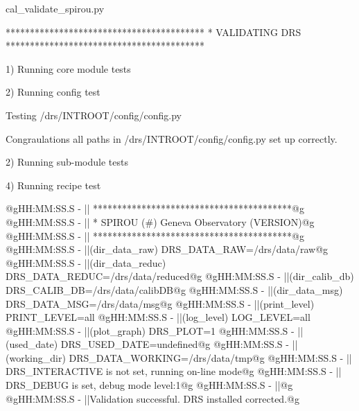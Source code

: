 \begin{cmdbox}
cal_validate_spirou.py
\end{cmdbox}
\begin{cmdboxprintspecial}[fontupper=\tiny, fontlower=\tiny]
 *****************************************
 *        VALIDATING DRS 
 *****************************************

1) Running core module tests

2) Running config test

         Testing /drs/INTROOT/config/config.py

                Congraulations all paths in /drs/INTROOT/config/config.py set up correctly.

2) Running sub-module tests

4) Running recipe test

@gHH:MM:SS.S -   || *****************************************@g
@gHH:MM:SS.S -   || * SPIROU \@(#) Geneva Observatory (VERSION)@g
@gHH:MM:SS.S -   || *****************************************@g
@gHH:MM:SS.S -   ||(dir_data_raw)      DRS_DATA_RAW=/drs/data/raw@g
@gHH:MM:SS.S -   ||(dir_data_reduc)    DRS_DATA_REDUC=/drs/data/reduced@g
@gHH:MM:SS.S -   ||(dir_calib_db)      DRS_CALIB_DB=/drs/data/calibDB@g
@gHH:MM:SS.S -   ||(dir_data_msg)      DRS_DATA_MSG=/drs/data/msg@g
@gHH:MM:SS.S -   ||(print_level)       PRINT_LEVEL=all         %
@gHH:MM:SS.S -   ||(log_level)         LOG_LEVEL=all         %
@gHH:MM:SS.S -   ||(plot_graph)        DRS_PLOT=1            %
@gHH:MM:SS.S -   ||(used_date)         DRS_USED_DATE=undefined@g
@gHH:MM:SS.S -   ||(working_dir)       DRS_DATA_WORKING=/drs/data/tmp@g
@gHH:MM:SS.S -   ||                    DRS_INTERACTIVE is not set, running on-line mode@g
@gHH:MM:SS.S -   ||                    DRS_DEBUG is set, debug mode level:1@g
@gHH:MM:SS.S -   ||@g
@gHH:MM:SS.S -   ||Validation successful. DRS installed corrected.@g

\end{cmdboxprintspecial}
